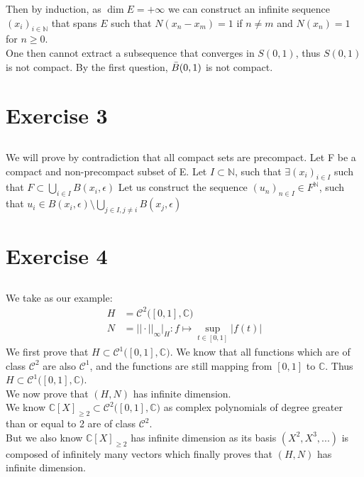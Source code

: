 \documentclass{article}
\begin{document}
\noindent Then by induction, as $\dim E = + \infty$ we can construct an infinite sequence $(x_i)_{i \in \mathbb{N}}$ that spans $E$ such that $N(x_n - x_m) = 1$ if $n \neq m$ and $N(x_n) = 1$ for $n \geq 0$.\\

\noindent One then cannot extract a subsequence that converges in $S(0,1)$, thus $S(0,1)$ is not compact. By the first question, $\Bar{B}(0,1)$ is not compact. 


\section{Exercise 3}
\subsection{} %
We will prove by contradiction that all compact sets are precompact.
Let F be a compact and non-precompact subset of E.
Let $I \subset \mathbb{N}$, such that $\exists (x_i)_{i \in I}$ such that $F\subset\bigcup\limits_{i\in I}B(x_i, \epsilon)$ 
Let us construct the sequence $(u_n)_{n \in I} \in F^{\mathbb{N}}$, such that $u_i \in B(x_i,\epsilon) \setminus \bigcup \limits_{j\in I, j \neq i}B(x_j, \epsilon) $


\section{Exercise 4}
\subsection{} %
We take as our example:
\begin{align*}
	H &= \mathcal{C}^2\big( [0,1] , \mathbb{C} \big)\\
	N &= ||\cdot || _{\infty} \big|_{H} : f \mapsto \sup_{t \in [0,1]} |f(t)|
\end{align*}
We first prove that $H \subset \mathcal{C}^1\big( [0,1] , \mathbb{C} \big)$. We know that all functions which are of class $\mathcal{C}^2$ are also $\mathcal{C}^1$, and the functions are still mapping from $[0,1]$ to $\mathbb{C}$. Thus $H \subset \mathcal{C}^1\big( [0,1] , \mathbb{C} \big)$.\\

\noindent We now prove that $(H, N)$ has infinite dimension. \\
We know $\mathbb{C}[X]_{\geq 2} \subset \mathcal{C}^2\big( [0,1] , \mathbb{C} \big)$ as complex polynomials of degree greater than or equal to 2 are of class $\mathcal{C}^2$. \\
But we also know $\mathbb{C}[X]_{\geq 2}$ has infinite dimension as its basis $(X^2, X^3, ...)$ is composed of infinitely many vectors which finally proves that $(H, N)$ has infinite dimension. 
\end{document}
